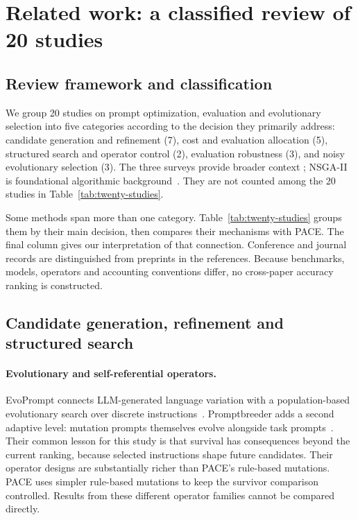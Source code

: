 \section{Related work: a classified review of 20 studies}
\label{sec:literature}
\subsection{Review framework and classification}
We group 20 studies on prompt optimization, evaluation and evolutionary selection
into five categories according to the decision they primarily address: candidate
generation and refinement (7), cost and evaluation allocation (5), structured
search and operator control (2), evaluation robustness (3), and noisy evolutionary
selection (3). The three surveys provide broader context
\cite{survey_li,survey_cui,survey_ramnath}; NSGA-II is foundational algorithmic
background~\cite{nsga2}. They are not counted among the 20 studies in
Table~\ref{tab:twenty-studies}.

Some methods span more than one category. Table~\ref{tab:twenty-studies}
groups them by their main decision, then compares their mechanisms with PACE.
The final column gives our interpretation of that connection. Conference and
journal records are distinguished from preprints in the references. Because
benchmarks, models, operators and accounting conventions differ, no cross-paper
accuracy ranking is constructed.

\subsection{Candidate generation, refinement and structured search}
\paragraph{Evolutionary and self-referential operators.}
EvoPrompt connects LLM-generated language variation with a population-based
evolutionary search over discrete instructions~\cite{evoprompt}. Promptbreeder
adds a second adaptive level: mutation prompts themselves evolve alongside task
prompts~\cite{promptbreeder}. Their common lesson for this study is that survival
has consequences beyond the current ranking, because selected instructions shape
future candidates. Their operator designs are substantially richer than PACE's
rule-based mutations. PACE uses simpler rule-based mutations to keep the survivor comparison
controlled. Results from these different operator families cannot be compared
directly.

